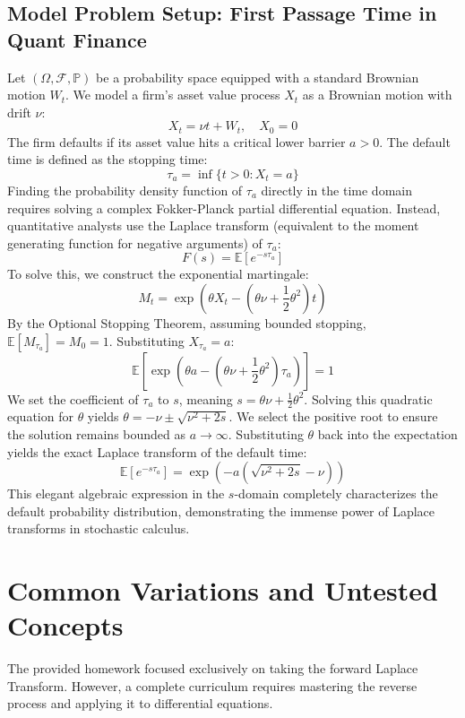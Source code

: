 \documentclass[11pt, a4paper]{article}
\theoremstyle{definition}
\theoremstyle{remark}
\newcommand{\E}{\mathbb{E}}
\newcommand{\Prob}{\mathbb{P}}
\newcommand{\F}{\mathcal{F}}
\begin{document}
\subsection{Model Problem Setup: First Passage Time in Quant Finance}
Let $(\Omega, \F, \Prob)$ be a probability space equipped with a standard Brownian motion $W_t$. We model a firm's asset value process $X_t$ as a Brownian motion with drift $\nu$:
\[
X_t = \nu t + W_t, \quad X_0 = 0
\]
The firm defaults if its asset value hits a critical lower barrier $a > 0$. The default time is defined as the stopping time:
\[
\tau_a = \inf \{ t > 0 : X_t = a \}
\]
Finding the probability density function of $\tau_a$ directly in the time domain requires solving a complex Fokker-Planck partial differential equation. Instead, quantitative analysts use the Laplace transform (equivalent to the moment generating function for negative arguments) of $\tau_a$:
\[
F(s) = \E[e^{-s \tau_a}]
\]
To solve this, we construct the exponential martingale:
\[
M_t = \exp\left( \theta X_t - \left( \theta \nu + \frac{1}{2}\theta^2 \right) t \right)
\]
By the Optional Stopping Theorem, assuming bounded stopping, $\E[M_{\tau_a}] = M_0 = 1$. Substituting $X_{\tau_a} = a$:
\[
\E\left[ \exp\left( \theta a - \left( \theta \nu + \frac{1}{2}\theta^2 \right) \tau_a \right) \right] = 1
\]
We set the coefficient of $\tau_a$ to $s$, meaning $s = \theta \nu + \frac{1}{2}\theta^2$. Solving this quadratic equation for $\theta$ yields $\theta = -\nu \pm \sqrt{\nu^2 + 2s}$. We select the positive root to ensure the solution remains bounded as $a \to \infty$. Substituting $\theta$ back into the expectation yields the exact Laplace transform of the default time:
\[
\E[e^{-s \tau_a}] = \exp\left( -a \left( \sqrt{\nu^2 + 2s} - \nu \right) \right)
\]
This elegant algebraic expression in the $s$-domain completely characterizes the default probability distribution, demonstrating the immense power of Laplace transforms in stochastic calculus.

\newpage

\section{Common Variations and Untested Concepts}
The provided homework focused exclusively on taking the forward Laplace Transform. However, a complete curriculum requires mastering the reverse process and applying it to differential equations.
\end{document}
